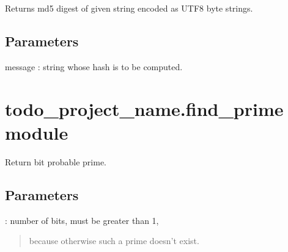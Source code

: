 \documentclass[letterpaper,10pt,english]{sphinxmanual}
\begin{document}

\begin{fulllineitems}
\label{\detokenize{todo_project_name:todo_project_name.core.md5_string}}
\pysigstartsignatures
{}
\pysigstopsignatures
\sphinxAtStartPar
Returns md5 digest of given string encoded as UTF\sphinxhyphen{}8 byte strings.


\subsection{Parameters}
\label{\detokenize{todo_project_name:id1}}
\sphinxAtStartPar
message
: string whose hash is to be computed.

\end{fulllineitems}



\section{todo\_project\_name.find\_prime module}
\label{\detokenize{todo_project_name:module-todo_project_name.find_prime}}\label{\detokenize{todo_project_name:todo-project-name-find-prime-module}}

\begin{fulllineitems}
\label{\detokenize{todo_project_name:todo_project_name.find_prime.find_prime}}
\pysigstartsignatures
{}
\pysigstopsignatures
\sphinxAtStartPar
Return \sphinxhyphen{}bit probable prime.


\subsection{Parameters}
\label{\detokenize{todo_project_name:id2}}
\sphinxAtStartPar
{}
: number of bits, must be greater than 1,
\begin{quote}

\sphinxAtStartPar
because otherwise such a prime doesn’t exist.
\end{quote}

\end{fulllineitems}
\end{document}

